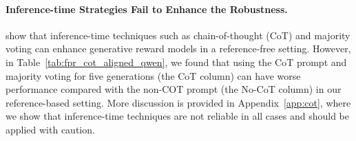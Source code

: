 \paragraph{Inference-time Strategies Fail to Enhance the Robustness.}
\citet{zhang2024generative} show that inference-time techniques such as chain-of-thought (CoT) and majority voting can enhance generative reward models in a reference-free setting. However, in Table~\ref{tab:fpr_cot_aligned_qwen}, we found that using the CoT prompt and majority voting for five generations (the CoT column) can have worse performance compared with the non-COT prompt (the No-CoT column) in our reference-based setting. More discussion is provided in Appendix~\ref{app:cot}, where we show that inference-time techniques are not reliable in all cases and should be applied with caution.







